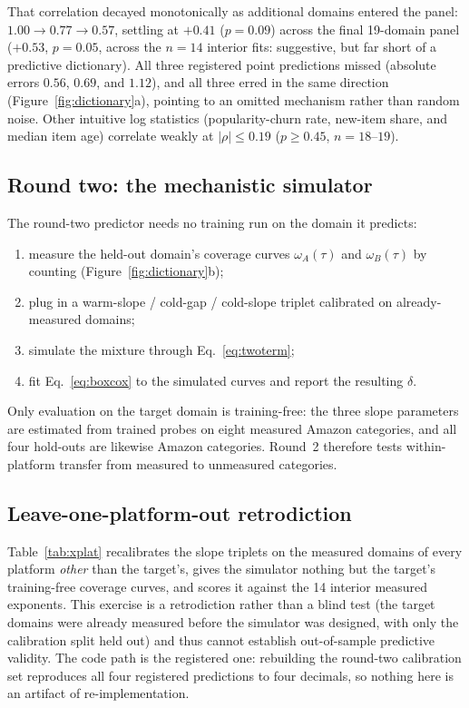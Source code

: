 \documentclass[10pt,letterpaper]{article}
\begin{document}
That correlation decayed monotonically as additional domains entered the panel:
$1.00 \to 0.77 \to 0.57$, settling at $+0.41$ ($p = 0.09$) across the final
19-domain panel ($+0.53$, $p = 0.05$, across the $n = 14$ interior fits:
suggestive, but far short of a predictive dictionary). All three registered
point predictions missed (absolute errors $0.56$, $0.69$, and $1.12$), and all
three erred in the same direction (Figure~\ref{fig:dictionary}a), pointing to an
omitted mechanism rather than random noise. Other intuitive log statistics
(popularity-churn rate, new-item share, and median item age) correlate weakly at
$|\rho| \le 0.19$ ($p \ge 0.45$, $n = 18$--$19$).

\subsection{Round two: the mechanistic simulator}

The round-two predictor needs no training run on the domain it predicts:

\begin{enumerate}
\item measure the held-out domain's coverage curves
      $\omega_A(\tau)$ and $\omega_B(\tau)$ by counting
      (Figure~\ref{fig:dictionary}b);
\item plug in a warm-slope / cold-gap / cold-slope triplet calibrated on
      already-measured domains;
\item simulate the mixture through Eq.~\eqref{eq:twoterm};
\item fit Eq.~\eqref{eq:boxcox} to the simulated curves and report the
      resulting $\delta$.
\end{enumerate}

Only evaluation on the target domain is training-free: the three slope
parameters are estimated from trained probes on eight measured Amazon
categories, and all four hold-outs are likewise Amazon categories. Round~2
therefore tests within-platform transfer from measured to unmeasured
categories.

\subsection{Leave-one-platform-out retrodiction}

Table~\ref{tab:xplat} recalibrates the slope triplets on the measured
domains of every platform \emph{other} than the target's, gives the
simulator nothing but the target's training-free coverage curves, and scores
it against the 14 interior measured exponents. This exercise is a retrodiction
rather than a blind test (the target domains were already measured before the
simulator was designed, with only the calibration split held out) and thus
cannot establish out-of-sample predictive validity. The code path is the
registered one: rebuilding the round-two calibration set reproduces all four
registered predictions to four decimals, so nothing here is an artifact of
re-implementation.
\end{document}
